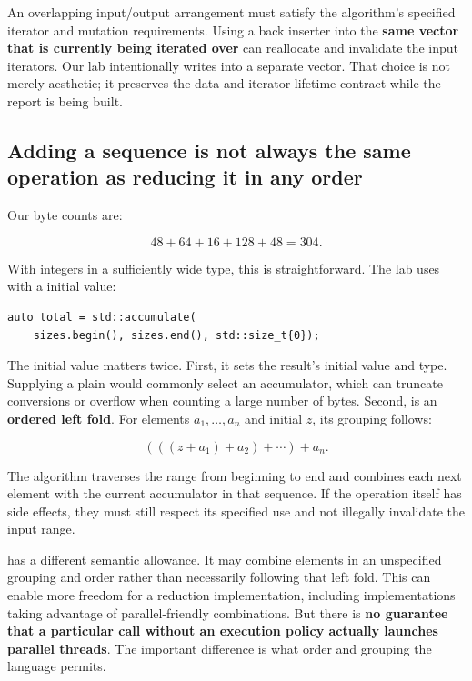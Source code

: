 An overlapping input/output arrangement must satisfy the algorithm's specified iterator and mutation requirements. Using a back inserter into the \textbf{same vector that is currently being iterated over} can reallocate and invalidate the input iterators. Our lab intentionally writes into a separate vector. That choice is not merely aesthetic; it preserves the data and iterator lifetime contract while the report is being built.

\subsection{Adding a sequence is not always the same operation as reducing it in any order}\label{05-engine-i-ch006-adding-a-sequence-is-not-always-the-same-operation-as-reducing-it-in-any-order}

\hypertarget{05-engine-i-ch006-adding-a-sequence-is-not-always-the-same-operation-as-reducing-it-in-any-order}{}

Our byte counts are:

\[
48+64+16+128+48 = 304.
\]

With integers in a sufficiently wide type, this is straightforward. The lab uses  with a  initial value:

\begin{verbatim}
auto total = std::accumulate(
    sizes.begin(), sizes.end(), std::size_t{0});
\end{verbatim}

The initial value matters twice. First, it sets the result's initial value and type. Supplying a plain  would commonly select an  accumulator, which can truncate conversions or overflow when counting a large number of bytes. Second,  is an \textbf{ordered left fold}. For elements \(a_1,\ldots,a_n\) and initial \(z\), its grouping follows:

\[
(((z+a_1)+a_2)+\cdots)+a_n.
\]

The algorithm traverses the range from beginning to end and combines each next element with the current accumulator in that sequence. If the operation itself has side effects, they must still respect its specified use and not illegally invalidate the input range.

 has a different semantic allowance. It may combine elements in an unspecified grouping and order rather than necessarily following that left fold. This can enable more freedom for a reduction implementation, including implementations taking advantage of parallel-friendly combinations. But there is \textbf{no guarantee that a particular call without an execution policy actually launches parallel threads}. The important difference is what order and grouping the language permits.

